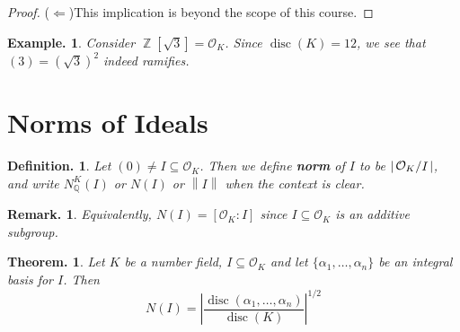 \documentclass[11pt, a4paper]{memoir}
\DeclareMathOperator{\Q}{{\mathbb{Q}}}
\DeclareMathOperator{\Z}{{\mathbb{Z}}}
\newcommand{\impendc}{\hspace{0.3cm}}
\newcommand{\iimpl}{($\Leftarrow$)}
\newcommand{\impl}{\iimpl\impendc}
\newcommand{\norm}[1]{\ensuremath{\left\lVert#1\right\rVert}}
\theoremstyle{change}
\newtheorem{theorem}{Theorem.}[section]
\theoremstyle{plain}
\theoremstyle{nonumberplain}
\newtheorem{definition}{Definition.}
\newtheorem{example}{Example.}
\newtheorem{remark}{Remark.}
\newtheorem{proof}{Proof}
\DeclareMathOperator{\disc}{disc}
\newcommand{\quot}[2]{\mathchoice{\left.\raisebox{0.07em}{$#1$}\middle/\raisebox{-0.07em}{$#2$}\right.}
                                 {\left.\raisebox{0.03em}{$#1$}\middle/\raisebox{-0.03em}{$#2$}\right.}
                                 {\left.\raisebox{0.00em}{$#1$}\middle/\raisebox{-0.00em}{$#2$}\right.}
                                 {\left.\raisebox{0em}{$#1$}\middle/\raisebox{0em}{$#2$}\right.}}
\newcommand{\mbf}[1]{{\boldmath\bfseries #1}}
\numberwithin{equation}{section}
\begin{document}
\begin{proof}
    \impl This implication is beyond the scope of this course.
\end{proof}
\begin{example}
    Consider $\Z[\sqrt{3}]=\mathcal{O}_K$.
    Since $\disc(K)=12$, we see that $(3)=(\sqrt{3})^2$ indeed ramifies.
\end{example}

\section{Norms of Ideals}
\begin{definition}
    Let $(0)\neq I\subseteq\mathcal{O}_K$.
    Then we define \mbf{norm} of $I$ to be $\left\lvert\quot{\mathcal{O}_K}{I}\right\rvert$, and write $N_{\Q}^K(I)$ or $N(I)$ or $\norm{I}$ when the context is clear.
\end{definition}
\begin{remark}
    Equivalently, $N(I)=[\mathcal{O}_K:I]$ since $I\subseteq\mathcal{O}_K$ is an additive subgroup.
\end{remark}
\begin{theorem}\label{t:id-norm}
    Let $K$ be a number field, $I\subseteq\mathcal{O}_K$ and let $\{\alpha_1,\ldots,\alpha_n\}$ be an integral basis for $I$.
    Then
    \begin{equation*}
        N(I)=\left\lvert\frac{\disc(\alpha_1,\ldots,\alpha_n)}{\disc(K)}\right\rvert^{1/2}
    \end{equation*}
\end{theorem}
\end{document}

